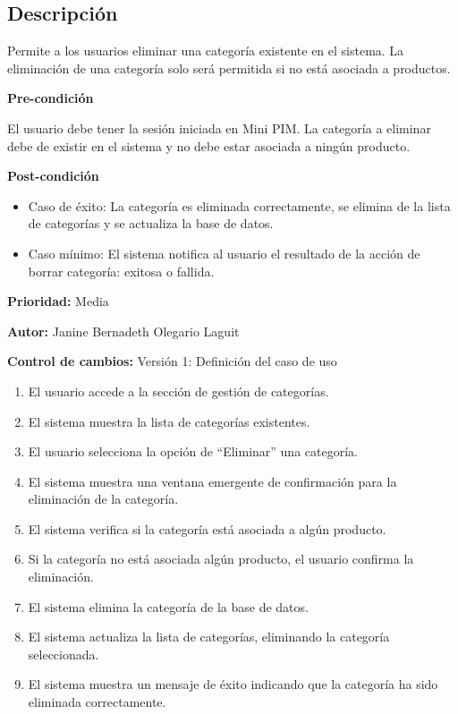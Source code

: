 
\subsection*{Descripción}
Permite a los usuarios eliminar una categoría existente en el sistema. La eliminación de una categoría solo será permitida si no está asociada a productos.\par
\vspace{0.15cm}

\textbf{Pre-condición}\par
El usuario debe tener la sesión iniciada en Mini PIM. La categoría a eliminar debe de existir en el sistema y no debe estar asociada a ningún producto.\par
\vspace{0.15cm}

\textbf{Post-condición}
\begin{itemize}
    \item Caso de éxito: La categoría es eliminada correctamente, se elimina de la lista de categorías y se actualiza la base de datos.
    \item Caso mínimo: El sistema notifica al usuario el resultado de la acción de borrar categoría: exitosa o fallida.
\end{itemize}

\textbf{Prioridad: }
Media
\vspace{0.15cm}

\textbf{Autor: }
Janine Bernadeth Olegario Laguit\par
\vspace{0.15cm}

\textbf{Control de cambios: } Versión 1: Definición del caso de uso

\begin{enumerate}
    \item El usuario accede a la sección de gestión de categorías.
    \item El sistema muestra la lista de categorías existentes.
    \item El usuario selecciona la opción de \enquote{Eliminar} una categoría.
    \item El sistema muestra una ventana emergente de confirmación para la eliminación de la categoría.
    \item El sistema verifica si la categoría está asociada a algún producto.
    \item Si la categoría no está asociada algún producto, el usuario confirma la eliminación.
    \item El sistema elimina la categoría de la base de datos.
    \item El sistema actualiza la lista de categorías, eliminando la categoría seleccionada.
    \item El sistema muestra un mensaje de éxito indicando que la categoría ha sido eliminada correctamente.
\end{enumerate}

